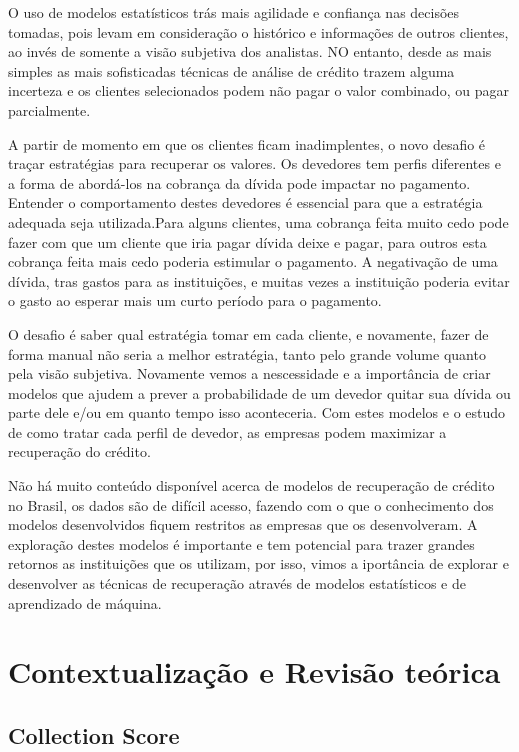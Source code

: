 \documentclass[12pt,a4paper]{article}
\begin{document}
    O uso de modelos estatísticos trás mais agilidade e confiança nas decisões tomadas, pois levam em consideração o histórico e informações de outros clientes, ao invés de somente a visão subjetiva dos analistas. NO entanto, desde as mais simples as mais sofisticadas técnicas de análise de crédito trazem alguma incerteza e os clientes selecionados podem não pagar o valor combinado, ou pagar parcialmente.
    
    A partir de momento em que os clientes ficam inadimplentes, o novo desafio é traçar estratégias para recuperar os valores. Os devedores tem perfis diferentes e a forma de abordá-los na cobrança da dívida pode impactar no pagamento. Entender o comportamento destes devedores é essencial para que a estratégia adequada seja utilizada.Para alguns clientes, uma cobrança feita muito cedo pode fazer com que um cliente que iria pagar dívida deixe e pagar, para outros esta cobrança feita mais cedo poderia estimular o pagamento. A negativação de uma dívida, tras gastos para as instituições, e muitas vezes a instituição poderia evitar o gasto ao esperar mais um curto período para o pagamento.
    
    O desafio é saber qual estratégia tomar em cada cliente, e novamente, fazer de forma manual não seria a melhor estratégia, tanto pelo grande volume quanto pela visão subjetiva. Novamente vemos a nescessidade e a importância de criar modelos que ajudem a prever a probabilidade de um devedor quitar sua dívida ou parte dele e/ou em quanto tempo isso aconteceria. Com estes modelos e o estudo de como tratar cada perfil de devedor, as empresas podem maximizar a recuperação do crédito.
    
    Não há muito conteúdo disponível acerca de modelos de recuperação de crédito no Brasil, os dados são de difícil acesso, fazendo com o que o conhecimento dos modelos desenvolvidos fiquem restritos as empresas que os desenvolveram. A exploração destes modelos é importante e tem potencial para trazer grandes retornos as instituições que os utilizam, por isso, vimos a iportância de explorar e desenvolver as técnicas de recuperação através de modelos estatísticos e de aprendizado de máquina.
    
\section{Contextualização e Revisão teórica}
 
 
\subsection{Collection Score}
\end{document}
